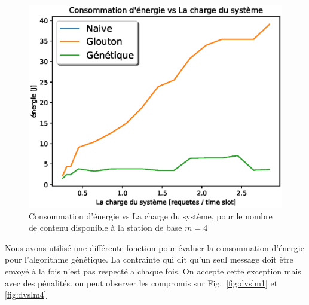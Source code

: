 \documentclass[runningheads]{llncs}
\begin{document}
\begin{figure}[H]
    \includegraphics[width=\textwidth]{EvsL4.eps}
    \caption{Consommation d'énergie vs La charge du système, pour 
    le nombre de contenu disponible \`a la station de base $m=4$} 
    \label{fig:evslm4}
\end{figure}

Nous avons utilisé une différente fonction pour évaluer la consommation 
d'énergie pour l'algorithme génétique.
La contrainte qui dit qu'un seul message doit être envoyé à la 
fois n'est  pas respecté a chaque fois.
On accepte cette exception mais avec des pénalités. 
on peut observer les compromis sur Fig.~\ref{fig:dvslm1} et \ref{fig:dvslm4}
\end{document}
